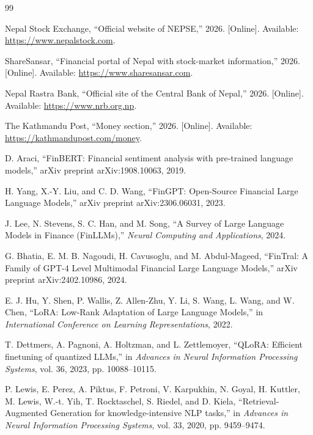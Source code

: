 \documentclass[12pt,a4paper]{report}
\begin{document}
\begingroup
\sloppy
{}
\begin{thebibliography}{99}

Nepal Stock Exchange, ``Official website of NEPSE,'' 2026. [Online]. Available: \url{https://www.nepalstock.com}.

ShareSansar, ``Financial portal of Nepal with stock-market information,'' 2026. [Online]. Available: \url{https://www.sharesansar.com}.

Nepal Rastra Bank, ``Official site of the Central Bank of Nepal,'' 2026. [Online]. Available: \url{https://www.nrb.org.np}.

The Kathmandu Post, ``Money section,'' 2026. [Online]. Available: \url{https://kathmandupost.com/money}.

D. Araci, ``FinBERT: Financial sentiment analysis with pre-trained language models,'' arXiv preprint arXiv:1908.10063, 2019.

H. Yang, X.-Y. Liu, and C. D. Wang, ``FinGPT: Open-Source Financial Large Language Models,'' arXiv preprint arXiv:2306.06031, 2023.

J. Lee, N. Stevens, S. C. Han, and M. Song, ``A Survey of Large Language Models in Finance (FinLLMs),'' \emph{Neural Computing and Applications}, 2024.

G. Bhatia, E. M. B. Nagoudi, H. Cavusoglu, and M. Abdul-Mageed, ``FinTral: A Family of GPT-4 Level Multimodal Financial Large Language Models,'' arXiv preprint arXiv:2402.10986, 2024.

E. J. Hu, Y. Shen, P. Wallis, Z. Allen-Zhu, Y. Li, S. Wang, L. Wang, and W. Chen, ``LoRA: Low-Rank Adaptation of Large Language Models,'' in \emph{International Conference on Learning Representations}, 2022.

T. Dettmers, A. Pagnoni, A. Holtzman, and L. Zettlemoyer, ``QLoRA: Efficient finetuning of quantized LLMs,'' in \emph{Advances in Neural Information Processing Systems}, vol. 36, 2023, pp. 10088--10115.

P. Lewis, E. Perez, A. Piktus, F. Petroni, V. Karpukhin, N. Goyal, H. Kuttler, M. Lewis, W.-t. Yih, T. Rocktaschel, S. Riedel, and D. Kiela, ``Retrieval-Augmented Generation for knowledge-intensive NLP tasks,'' in \emph{Advances in Neural Information Processing Systems}, vol. 33, 2020, pp. 9459--9474.


\end{thebibliography}
\end{document}
